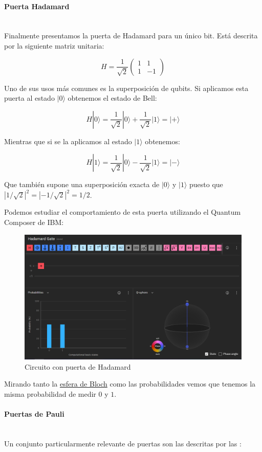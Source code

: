 \documentclass[11pt]{article}
\newcommand{\ra}{\rangle}
\newcommand{\myparagraph}[1]{\paragraph*{#1}\mbox{}\\}
\theoremstyle{plain}
\begin{document}
\myparagraph{Puerta Hadamard}


Finalmente presentamos la puerta de Hadamard para un único bit. Está descrita por la siguiente matriz unitaria:

\[
	H = \frac{1}{\sqrt 2}
	\begin{pmatrix}
		1 & 1 \\
		1 & -1 
	\end{pmatrix}
\]

Uno de sus usos más comunes es la superposición de qubits. Si aplicamos esta puerta al estado $|0\ra$ obtenemos el estado de Bell:

\[
	H|0\ra = \frac{1}{\sqrt 2} |0\ra + \frac{1}{\sqrt 2} |1\ra = |+\ra
\]

Mientras que si se la aplicamos al estado $|1\ra$ obtenemos:

\[
	H|1\ra = \frac{1}{\sqrt 2} |0\ra - \frac{1}{\sqrt 2} |1\ra = |-\ra
\]

Que también supone una superposición exacta de $|0\ra$ y $|1\ra$ puesto que $|1/\sqrt 2|^2 = |-1/\sqrt 2|^2 = 1/2$.

Podemos estudiar el comportamiento de esta puerta utilizando el Quantum Composer de IBM:

\begin{figure}[H]
	\centering
	\includegraphics[scale=0.5]{figures/gate-hadamard.png}
	\caption{Circuito con puerta de Hadamard}
\end{figure}

Mirando tanto la \href{URL}{esfera de Bloch} como las probabilidades vemos que tenemos la misma probabilidad de medir $0$ y $1$. \\


\myparagraph{Puertas de Pauli}


Un conjunto particularmente relevante de puertas son las descritas por las :
\end{document}
